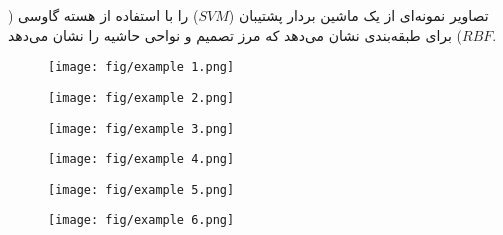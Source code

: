 \documentclass[12pt]{article}
\begin{document}
تصاویر نمونه‌ای از یک ماشین بردار پشتیبان ($SVM$) را با استفاده از هسته گاوسی ($RBF$) برای طبقه‌بندی نشان می‌دهد که مرز تصمیم و نواحی حاشیه را نشان می‌دهد.


\begin{figure}[!h]
\centering
\texttt{[image: fig/example 1.png]}

\label{fig:kkt2}
\end{figure}

\begin{figure}[!h]
\centering
\texttt{[image: fig/example 2.png]}

\label{fig:kkt2}
\end{figure}

\begin{figure}[!h]
\centering
\texttt{[image: fig/example 3.png]}

\label{fig:kkt2}
\end{figure}

\begin{figure}[!h]
\centering
\texttt{[image: fig/example 4.png]}

\label{fig:kkt2}
\end{figure}

\begin{figure}[!h]
\centering
\texttt{[image: fig/example 5.png]}

\label{fig:kkt2}
\end{figure}

\begin{figure}[!h]
\centering
\texttt{[image: fig/example 6.png]}

\label{fig:kkt2}
\end{figure}
\end{document}

